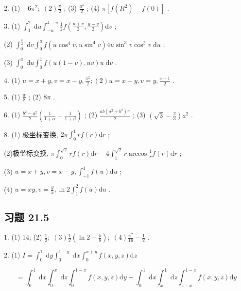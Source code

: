 2. (1) \(- 6{\pi }^{2};\;\left( 2\right) \frac{\pi }{2}\) ; (3) \(\frac{{a}^{4}}{2}\) ; (4) \(\pi \left\lbrack  {f\left( {R}^{2}\right)  - f\left( 0\right) }\right\rbrack\) .

3. (1) \({\int }_{1}^{2}\mathrm{\;d}u{\int }_{-u}^{4 - u}\frac{1}{2}f\left( {\frac{u + v}{2},\frac{u - v}{2}}\right) \mathrm{d}v\) ;

(2) \({\int }_{0}^{\frac{\pi }{2}}\mathrm{\;d}v{\int }_{0}^{a}f\left( {u{\cos }^{4}v,u{\sin }^{4}v}\right) {4u}{\sin }^{3}v{\cos }^{3}v\mathrm{\;d}u\) ;

(3) \({\int }_{0}^{a}\mathrm{\;d}u{\int }_{0}^{1}f\left( {u\left( {1 - v}\right) ,{uv}}\right) u\mathrm{\;d}v\) .

4. (1) \(u = x + y,v = x - y,\frac{{\pi }^{2}}{2};\left( 2\right) u = x + y,v = y,\frac{\mathrm{e} - 1}{2}\) .

5. (1) \(\frac{\pi }{8}\) ; (2) \({8\pi }\) .

6. (1) \(\frac{{b}^{2} - {a}^{2}}{2}\left( {\frac{1}{1 + \alpha } - \frac{1}{1 + \beta }}\right)\) ; (2) \(\frac{{ab}\left( {{a}^{2} + {b}^{2}}\right) \pi }{2}\) ; (3) \(\left( {\sqrt{3} - \frac{\pi }{3}}\right) {a}^{2}\) .

8. (1) 极坐标变换, \({2\pi }{\int }_{0}^{1}{rf}\left( r\right) \mathrm{d}r\) ;

(2)极坐标变换, \(\pi {\int }_{0}^{\sqrt{2}}{rf}\left( r\right) \mathrm{d}r - 4{\int }_{1}^{\sqrt{2}}r\arccos \frac{1}{r}f\left( r\right) \mathrm{d}r\) ;

(3) \(u = x + y,v = x - y,{\int }_{-1}^{1}f\left( u\right) \mathrm{d}u\) ;

(4) \(u = {xy},v = \frac{y}{x},\ln 2{\int }_{1}^{2}f\left( u\right) \mathrm{d}u\) .

\subsection{习题 21.5}

1. (1) 14; (2) \(\frac{1}{2};\;\left( 3\right) \frac{1}{2}\left( {\ln 2 - \frac{5}{8}}\right) ;\;\left( 4\right) \frac{{\pi }^{2}}{16} - \frac{1}{2}\) .

2. (1) \(I = {\int }_{0}^{1}\mathrm{\;d}y{\int }_{0}^{1 - y}\mathrm{\;d}x{\int }_{0}^{x + y}f\left( {x,y,z}\right) \mathrm{d}z\)

\[
= {\int }_{0}^{1}\mathrm{\;d}x{\int }_{0}^{x}\mathrm{\;d}z{\int }_{0}^{1 - x}f\left( {x,y,z}\right) \mathrm{d}y + {\int }_{0}^{1}\mathrm{\;d}x{\int }_{x}^{1}\mathrm{\;d}z{\int }_{z - x}^{1 - x}f\left( {x,y,z}\right) \mathrm{d}y
\]

